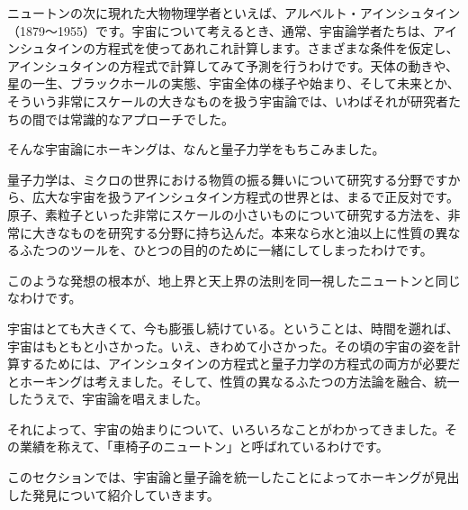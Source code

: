 \documentclass[10pt,b5paper,papersize,dvipdfmx]{jsbook}
\begin{document}
ニュートンの次に現れた大物物理学者といえば、アルベルト・アインシュタイン（1879～1955）です。宇宙について考えるとき、通常、宇宙論学者たちは、アインシュタインの方程式を使ってあれこれ計算します。さまざまな条件を仮定し、アインシュタインの方程式で計算してみて予測を行うわけです。天体の動きや、星の一生、ブラックホールの実態、宇宙全体の様子や始まり、そして未来とか、そういう非常にスケールの大きなものを扱う宇宙論では、いわばそれが研究者たちの間では常識的なアプローチでした。\par
そんな宇宙論にホーキングは、なんと量子力学をもちこみました。\par
量子力学は、ミクロの世界における物質の振る舞いについて研究する分野ですから、広大な宇宙を扱うアインシュタイン方程式の世界とは、まるで正反対です。原子、素粒子といった非常にスケールの小さいものについて研究する方法を、非常に大きなものを研究する分野に持ち込んだ。本来なら水と油以上に性質の異なるふたつのツールを、ひとつの目的のために一緒にしてしまったわけです。\par
このような発想の根本が、地上界と天上界の法則を同一視したニュートンと同じなわけです。\par
宇宙はとても大きくて、今も膨張し続けている。ということは、時間を遡れば、宇宙はもともと小さかった。いえ、きわめて小さかった。その頃の宇宙の姿を計算するためには、アインシュタインの方程式と量子力学の方程式の両方が必要だとホーキングは考えました。そして、性質の異なるふたつの方法論を融合、統一したうえで、宇宙論を唱えました。\par
それによって、宇宙の始まりについて、いろいろなことがわかってきました。その業績を称えて、「車椅子のニュートン」と呼ばれているわけです。\par
このセクションでは、宇宙論と量子論を統一したことによってホーキングが見出した発見について紹介していきます。\par
 
\end{document}
